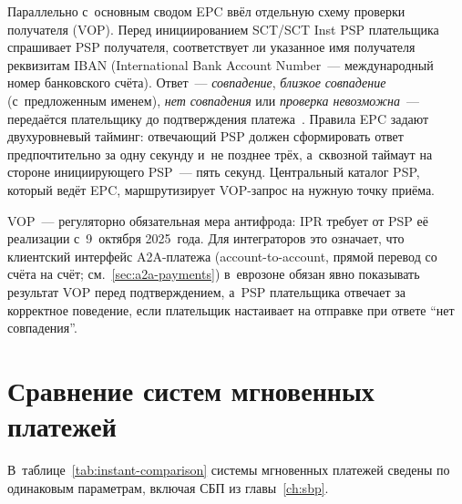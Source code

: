Параллельно с~основным сводом EPC ввёл отдельную схему проверки
получателя (VOP). Перед инициированием SCT/SCT Inst PSP плательщика
спрашивает PSP получателя, соответствует ли указанное имя получателя
реквизитам IBAN (International Bank Account Number~--- международный
номер банковского счёта). Ответ~--- \emph{совпадение}, \emph{близкое совпадение}
(с~предложенным именем), \emph{нет совпадения} или \emph{проверка
невозможна}~--- передаётся плательщику до подтверждения
платежа~\cite{epc-vop}. Правила EPC задают двухуровневый тайминг:
отвечающий PSP должен сформировать ответ предпочтительно за одну
секунду и~не позднее трёх, а~сквозной таймаут на стороне инициирующего
PSP~--- пять секунд. Центральный каталог PSP, который ведёт EPC,
маршрутизирует VOP-запрос на нужную точку приёма.

VOP~--- регуляторно обязательная мера антифрода: IPR требует
от PSP её реализации с~9~октября 2025~года. Для интеграторов это
означает, что клиентский интерфейс A2A-платежа (account-to-account,
прямой перевод со счёта на счёт; см.~\ref{sec:a2a-payments}) в~еврозоне обязан
явно показывать результат VOP перед подтверждением, а~PSP плательщика
отвечает за корректное поведение, если плательщик настаивает
на отправке при ответе \enquote{нет совпадения}.

\section{Сравнение систем мгновенных платежей}\label{sec:instant-comparison}

В~таблице~\ref{tab:instant-comparison} системы мгновенных платежей
сведены по одинаковым параметрам, включая СБП из главы~\ref{ch:sbp}.

